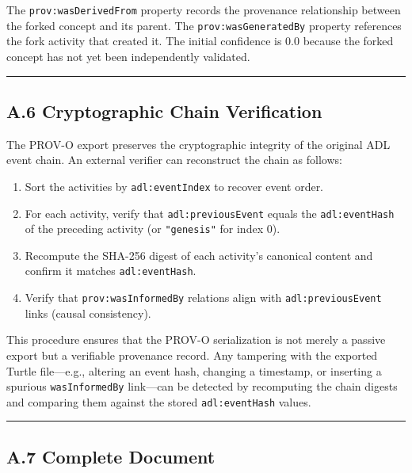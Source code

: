The \texttt{prov:wasDerivedFrom} property records the provenance relationship between the forked concept and its parent. The \texttt{prov:wasGeneratedBy} property references the fork activity that created it. The initial confidence is 0.0 because the forked concept has not yet been independently validated.

\begin{center}\rule{0.5\linewidth}{0.5pt}\end{center}


\subsection{A.6 Cryptographic Chain Verification}\label{a.6-cryptographic-chain-verification}

The PROV-O export preserves the cryptographic integrity of the original ADL event chain. An external verifier can reconstruct the chain as follows:

\begin{enumerate}
\def\labelenumi{\arabic{enumi}.}
\tightlist
\item
  Sort the activities by \texttt{adl:eventIndex} to recover event order.
\item
  For each activity, verify that \texttt{adl:previousEvent} equals the \texttt{adl:eventHash} of the preceding activity (or \texttt{"genesis"} for index 0).
\item
  Recompute the SHA-256 digest of each activity's canonical content and confirm it matches \texttt{adl:eventHash}.
\item
  Verify that \texttt{prov:wasInformedBy} relations align with \texttt{adl:previousEvent} links (causal consistency).
\end{enumerate}

This procedure ensures that the PROV-O serialization is not merely a passive export but a verifiable provenance record. Any tampering with the exported Turtle file---e.g., altering an event hash, changing a timestamp, or inserting a spurious \texttt{wasInformedBy} link---can be detected by recomputing the chain digests and comparing them against the stored \texttt{adl:eventHash} values.

\begin{center}\rule{0.5\linewidth}{0.5pt}\end{center}


\subsection{A.7 Complete Document}\label{a.7-complete-document}

